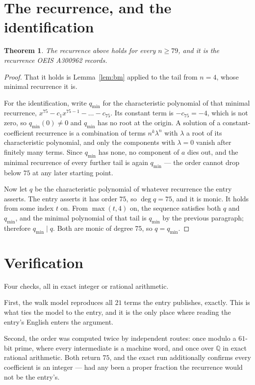 \documentclass[11pt,a4paper]{article}
\theoremstyle{plain}
\newtheorem{theorem}{Theorem}
\theoremstyle{definition}
\begin{document}
\section{The recurrence, and the identification}

\begin{theorem}
The recurrence above holds for every $n\ge79$, and it is the recurrence OEIS A300962 records.
\end{theorem}

\begin{proof}
That it holds is Lemma~\ref{lem:bm} applied to the tail from $n=4$, whose minimal
recurrence it is.

For the identification, write $q_{\min}$ for the characteristic polynomial of that minimal
recurrence, $x^{75}-c_1x^{75-1}-\dots-c_{75}$. Its constant term is
$-c_{75}=-4$, which is not zero, so $q_{\min}(0)\neq0$ and $q_{\min}$ has no
root at the origin. A solution of a constant-coefficient recurrence is a combination of terms
$n^{k}\lambda^{n}$ with $\lambda$ a root of its characteristic polynomial, and only the
components with $\lambda=0$ vanish after finitely many terms. Since $q_{\min}$ has none, no
component of $a$ dies out, and the minimal recurrence of every further tail is again
$q_{\min}$ --- the order cannot drop below $75$ at any later starting point.

Now let $q$ be the characteristic polynomial of whatever recurrence the entry asserts. The
entry asserts it has order $75$, so $\deg q=75$, and it is monic. It holds from some
index $t$ on. From $\max(t,4)$ on, the sequence satisfies both $q$ and $q_{\min}$, and
the minimal polynomial of that tail is $q_{\min}$ by the previous paragraph; therefore
$q_{\min}\mid q$. Both are monic of degree $75$, so $q=q_{\min}$.
\end{proof}

\section{Verification}

Four checks, all in exact integer or rational arithmetic.

First, the walk model reproduces all $21$ terms the entry publishes, exactly. This is
what ties the model to the entry, and it is the only place where reading the entry's English
enters the argument.

Second, the order was computed twice by independent routes: once modulo a $61$-bit prime, where
every intermediate is a machine word, and once over $\mathbb{Q}$ in exact rational arithmetic.
Both return $75$, and the exact run additionally confirms every coefficient is an integer
--- had any been a proper fraction the recurrence would not be the entry's.
\end{document}
